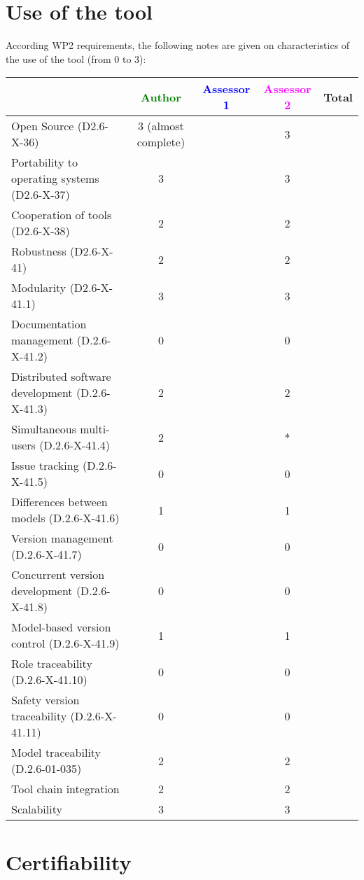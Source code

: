 \section{Use of the tool}


According WP2 requirements, the following notes are given on characteristics of the use of the tool (from 0 to 3):

\begin{tabular}{|l | c | c | c | c|}
\hline
& \textcolor{green}{Author} & \textcolor{blue}{Assessor 1} & \textcolor{magenta}{Assessor 2} & Total \\
\hline 
Open Source (D2.6-X-36) & 3 (almost complete)& & 3 &  \\
\hline 
Portability to operating systems (D2.6-X-37) & 3 & & 3 &  \\
\hline
Cooperation of tools (D2.6-X-38) & 2 & & 2 &  \\
\hline
Robustness (D2.6-X-41) & 2 & & 2 & \\
\hline
Modularity (D2.6-X-41.1) & 3 & & 3 & \\
\hline
Documentation management (D.2.6-X-41.2) & 0 & & 0 & \\
\hline
Distributed software development (D.2.6-X-41.3)  & 2 & & 2 & \\
\hline
Simultaneous multi-users (D.2.6-X-41.4)   & 2 & & * & \\
\hline
Issue tracking (D.2.6-X-41.5) & 0 & & 0 & \\
\hline
Differences between models (D.2.6-X-41.6) & 1 & & 1 & \\
\hline
Version management (D.2.6-X-41.7) & 0 & & 0 & \\
\hline
Concurrent version development (D.2.6-X-41.8) & 0 & & 0 & \\
\hline
Model-based version control (D.2.6-X-41.9) & 1 & & 1 & \\
\hline
Role traceability (D.2.6-X-41.10) & 0 & & 0 & \\
\hline
Safety version traceability (D.2.6-X-41.11) & 0 & & 0 & \\
\hline
Model traceability (D.2.6-01-035) & 2 & & 2 & \\
\hline
Tool chain integration & 2 & & 2 & \\
\hline
Scalability & 3 & & 3 & \\
\hline
\end{tabular}

\section{Certifiability}

